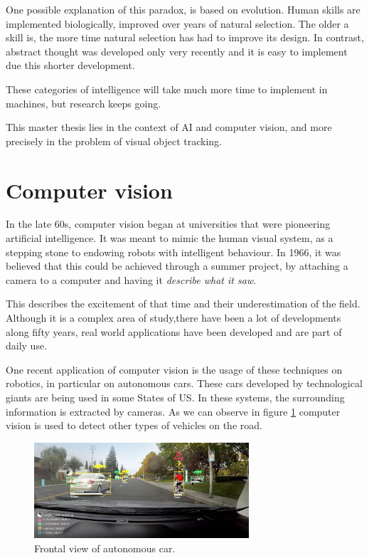 One possible explanation of this paradox, is based on evolution. Human skills are implemented biologically, improved over years of natural selection. The older a skill is, the more time natural selection has had to improve its design. In contrast, abstract thought was developed only very recently and it is easy to implement due this shorter development.

These categories of intelligence will take much more time to implement in machines, but research keeps going.

This master thesis lies in the context of AI and computer vision, and more precisely in the problem of visual object tracking.

\section{Computer vision}


In the late 60s, computer vision began at universities that were pioneering artificial intelligence. It was meant to mimic the human visual system, as a stepping stone to endowing robots with intelligent behaviour. In 1966, it was believed that this could be achieved through a summer project, by attaching a camera to a computer and having it \textit{describe what it saw}.

This describes the excitement of that time and their underestimation of the field. Although it is a complex area of study,there have been a lot of developments along fifty years, real world applications have been developed and are part of daily use. 

One recent application of computer vision is the usage of these techniques on robotics, in particular on autonomous cars. These cars developed by technological giants are being used in some States of US. In these systems, the surrounding information is extracted by cameras. As we can observe in figure \ref{intro1} computer vision is used to detect other types of vehicles on the road.

\begin{figure}[H]
\centering         
\includegraphics[width=8cm]{aplicaciones/autonomous.jpg}
\caption{Frontal view of autonomous car.} \label{intro1}
\end{figure}



